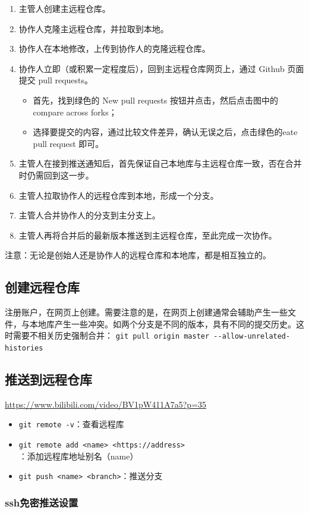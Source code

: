 \begin{enumerate}
\item  主管人创建主远程仓库。
\item 协作人克隆主远程仓库，并拉取到本地。
\item 协作人在本地修改，上传到协作人的克隆远程仓库。
\item 协作人立即（或积累一定程度后），回到主远程仓库网页上，通过 Github 页面提交 pull requests。
\begin{itemize}
\item 首先，找到绿色的 New pull requests 按钮并点击，然后点击图中的 compare across forks；
\item 选择要提交的内容，通过比较文件差异，确认无误之后，点击绿色的eate pull request 即可。
\end{itemize}
\item 主管人在接到推送通知后，首先保证自己本地库与主远程仓库一致，否在合并时仍需回到这一步。
\item 主管人拉取协作人的远程仓库到本地，形成一个分支。
\item 主管人合并协作人的分支到主分支上。
\item 主管人再将合并后的最新版本推送到主远程仓库，至此完成一次协作。
\end{enumerate}
注意：无论是创始人还是协作人的远程仓库和本地库，都是相互独立的。


\subsection{创建远程仓库}
注册账户，在网页上创建。需要注意的是，在网页上创建通常会辅助产生一些文件，与本地库产生一些冲突。如两个分支是不同的版本，具有不同的提交历史。这时需要不相关历史强制合并：
\verb|git pull origin master --allow-unrelated-histories |



\subsection{推送到远程仓库}
\url{https://www.bilibili.com/video/BV1pW411A7a5?p=35}
\begin{itemize}
\item \verb|git remote -v|：查看远程库
\item \verb|git remote add <name> <https://address> |：添加远程库地址别名（name）
\item \verb|git push <name> <branch>|：推送分支
\end{itemize}

\subsubsection{ssh免密推送设置}




